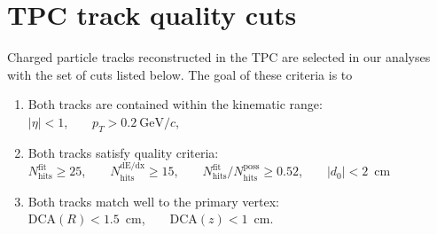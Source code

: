 

\chapter{TPC track quality cuts}\label{chap:TpcTrackQualityCuts}

Charged particle tracks reconstructed in the TPC are selected in our analyses with the set of cuts listed below. The goal of these criteria is to 
\begin{enumerate}
\item Both tracks are contained within the kinematic range:\label{enum:TpcKinematicCuts}\\[2pt]
$|\eta|<1$,~~~~$p_{T}>0.2~\textrm{GeV}/c$,
\item Both tracks satisfy quality criteria:\label{enum:TpcQualityCuts}\\[2pt]
$N_{\textrm{hits}}^{\textrm{fit}}\geq25$,~~~~$N_{\textrm{hits}}^{\textrm{dE/dx}}\geq15$,~~~~$N_{\textrm{hits}}^{\textrm{fit}}/N_{\textrm{hits}}^{\textrm{poss}}\geq0.52$,~~~~$|d_{0}|<2$~cm
\item Both tracks match well to the primary vertex:\label{enum:TpcDcaCuts}\\[2pt]
$\textrm{DCA}(R)<1.5$~cm,~~~~$\textrm{DCA}(z)<1$~cm.
\end{enumerate}
